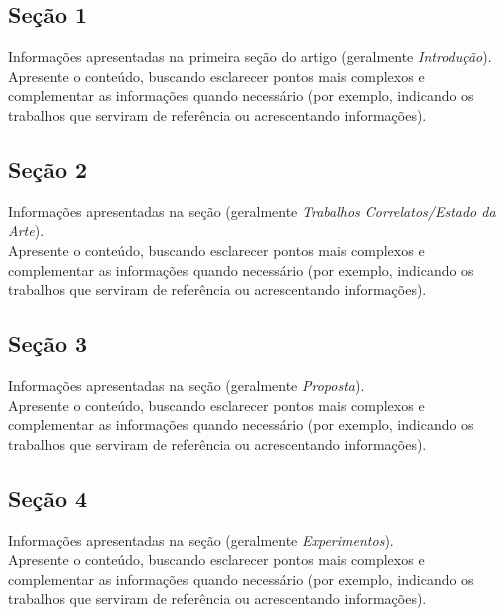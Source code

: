 \documentclass{UnBeamer}%
\begin{document}
    \subsection{Seção 1}%
    \begin{frame}%
        Informações apresentadas na primeira seção do artigo (geralmente \emph{Introdução}).%
        \\\vfill%
        Apresente o conteúdo, buscando esclarecer pontos mais complexos e complementar as informações quando necessário (por exemplo, indicando os trabalhos que serviram de referência ou acrescentando informações).
    \end{frame}%

    \subsection{Seção 2}%
    \begin{frame}%
        Informações apresentadas na seção (geralmente \emph{Trabalhos Correlatos/Estado da Arte}).%
        \\\vfill%
        Apresente o conteúdo, buscando esclarecer pontos mais complexos e complementar as informações quando necessário (por exemplo, indicando os trabalhos que serviram de referência ou acrescentando informações).
    \end{frame}%

    \subsection{Seção 3}%
    \begin{frame}%
        Informações apresentadas na seção (geralmente \emph{Proposta}).%
        \\\vfill%
        Apresente o conteúdo, buscando esclarecer pontos mais complexos e complementar as informações quando necessário (por exemplo, indicando os trabalhos que serviram de referência ou acrescentando informações).
    \end{frame}%

    \subsection{Seção 4}%
    \begin{frame}%
        Informações apresentadas na seção (geralmente \emph{Experimentos}).%
        \\\vfill%
        Apresente o conteúdo, buscando esclarecer pontos mais complexos e complementar as informações quando necessário (por exemplo, indicando os trabalhos que serviram de referência ou acrescentando informações).
    \end{frame}%
\end{document}
